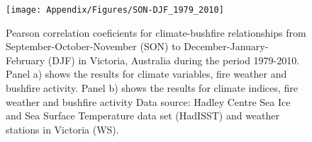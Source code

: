 \begin{figure}[H]
\begin{centering}
\texttt{[image: Appendix/Figures/SON-DJF\_1979\_2010]}
\par\end{centering}

\caption[Pearson correlation coeficients for climate-bushfire relationships
from September-October-November (SON) to December-January-February
(DJF) in Victoria, Australia during the period 1979-2010]{Pearson correlation coeficients for climate-bushfire relationships
from September-October-November (SON) to December-January-February
(DJF) in Victoria, Australia during the period 1979-2010. Panel a)
shows the results for climate variables, fire weather and bushfire
activity. Panel b) shows the results for climate indices, fire weather
and bushfire activity Data source: Hadley Centre Sea Ice and Sea Surface
Temperature data set (HadISST) and weather stations in Victoria (WS).
\label{fig:Pearson correlation coeficients for climate-bushfire relationships from September-October-November (SON) to December-January-February (DJF) in Victoria, Australia during the period 1979-2010}}


\end{figure}

